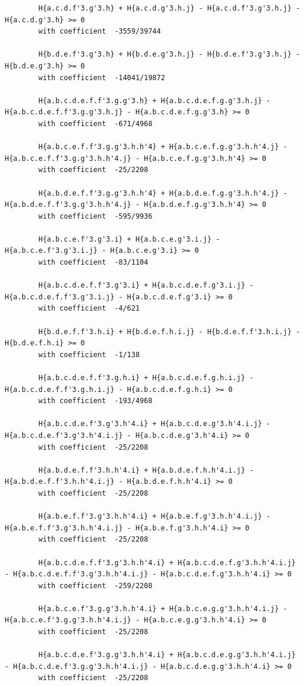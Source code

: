 \documentclass[11pt, a4paper]{kybernetika}
\begin{document}
\begin{verbatim}
		H{a.c.d.f'3.g'3.h} + H{a.c.d.g'3.h.j} - H{a.c.d.f'3.g'3.h.j} - H{a.c.d.g'3.h} >= 0
		with coefficient  -3559/39744
		
		H{b.d.e.f'3.g'3.h} + H{b.d.e.g'3.h.j} - H{b.d.e.f'3.g'3.h.j} - H{b.d.e.g'3.h} >= 0
		with coefficient  -14041/19872
		
		H{a.b.c.d.e.f.f'3.g.g'3.h} + H{a.b.c.d.e.f.g.g'3.h.j} - H{a.b.c.d.e.f.f'3.g.g'3.h.j} - H{a.b.c.d.e.f.g.g'3.h} >= 0
		with coefficient  -671/4968
		
		H{a.b.c.e.f.f'3.g.g'3.h.h'4} + H{a.b.c.e.f.g.g'3.h.h'4.j} - H{a.b.c.e.f.f'3.g.g'3.h.h'4.j} - H{a.b.c.e.f.g.g'3.h.h'4} >= 0
		with coefficient  -25/2208
		
		H{a.b.d.e.f.f'3.g.g'3.h.h'4} + H{a.b.d.e.f.g.g'3.h.h'4.j} - H{a.b.d.e.f.f'3.g.g'3.h.h'4.j} - H{a.b.d.e.f.g.g'3.h.h'4} >= 0
		with coefficient  -595/9936
		
		H{a.b.c.e.f'3.g'3.i} + H{a.b.c.e.g'3.i.j} - H{a.b.c.e.f'3.g'3.i.j} - H{a.b.c.e.g'3.i} >= 0
		with coefficient  -83/1104
		
		H{a.b.c.d.e.f.f'3.g'3.i} + H{a.b.c.d.e.f.g'3.i.j} - H{a.b.c.d.e.f.f'3.g'3.i.j} - H{a.b.c.d.e.f.g'3.i} >= 0
		with coefficient  -4/621
		
		H{b.d.e.f.f'3.h.i} + H{b.d.e.f.h.i.j} - H{b.d.e.f.f'3.h.i.j} - H{b.d.e.f.h.i} >= 0
		with coefficient  -1/138
		
		H{a.b.c.d.e.f.f'3.g.h.i} + H{a.b.c.d.e.f.g.h.i.j} - H{a.b.c.d.e.f.f'3.g.h.i.j} - H{a.b.c.d.e.f.g.h.i} >= 0
		with coefficient  -193/4968
		
		H{a.b.c.d.e.f'3.g'3.h'4.i} + H{a.b.c.d.e.g'3.h'4.i.j} - H{a.b.c.d.e.f'3.g'3.h'4.i.j} - H{a.b.c.d.e.g'3.h'4.i} >= 0
		with coefficient  -25/2208
		
		H{a.b.d.e.f.f'3.h.h'4.i} + H{a.b.d.e.f.h.h'4.i.j} - H{a.b.d.e.f.f'3.h.h'4.i.j} - H{a.b.d.e.f.h.h'4.i} >= 0
		with coefficient  -25/2208
		
		H{a.b.e.f.f'3.g'3.h.h'4.i} + H{a.b.e.f.g'3.h.h'4.i.j} - H{a.b.e.f.f'3.g'3.h.h'4.i.j} - H{a.b.e.f.g'3.h.h'4.i} >= 0
		with coefficient  -25/2208
		
		H{a.b.c.d.e.f.f'3.g'3.h.h'4.i} + H{a.b.c.d.e.f.g'3.h.h'4.i.j} - H{a.b.c.d.e.f.f'3.g'3.h.h'4.i.j} - H{a.b.c.d.e.f.g'3.h.h'4.i} >= 0
		with coefficient  -259/2208
		
		H{a.b.c.e.f'3.g.g'3.h.h'4.i} + H{a.b.c.e.g.g'3.h.h'4.i.j} - H{a.b.c.e.f'3.g.g'3.h.h'4.i.j} - H{a.b.c.e.g.g'3.h.h'4.i} >= 0
		with coefficient  -25/2208
		
		H{a.b.c.d.e.f'3.g.g'3.h.h'4.i} + H{a.b.c.d.e.g.g'3.h.h'4.i.j} - H{a.b.c.d.e.f'3.g.g'3.h.h'4.i.j} - H{a.b.c.d.e.g.g'3.h.h'4.i} >= 0
		with coefficient  -25/2208
		

\end{verbatim}
\end{document}
